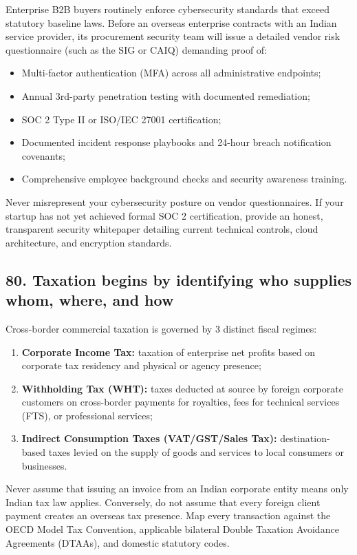Enterprise B2B buyers routinely enforce cybersecurity standards that exceed statutory baseline laws. Before an overseas enterprise contracts with an Indian service provider, its procurement security team will issue a detailed vendor risk questionnaire (such as the SIG or CAIQ) demanding proof of:
\begin{itemize}
    \item Multi-factor authentication (MFA) across all administrative endpoints;
    \item Annual 3rd-party penetration testing with documented remediation;
    \item SOC 2 Type II or ISO/IEC 27001 certification;
    \item Documented incident response playbooks and 24-hour breach notification covenants;
    \item Comprehensive employee background checks and security awareness training.
\end{itemize}
Never misrepresent your cybersecurity posture on vendor questionnaires. If your startup has not yet achieved formal SOC 2 certification, provide an honest, transparent security whitepaper detailing current technical controls, cloud architecture, and encryption standards.

\subsection{80. Taxation begins by identifying who supplies whom, where, and how}

Cross-border commercial taxation is governed by 3 distinct fiscal regimes:
\begin{enumerate}
    \item \textbf{Corporate Income Tax:} taxation of enterprise net profits based on corporate tax residency and physical or agency presence;
    \item \textbf{Withholding Tax (WHT):} taxes deducted at source by foreign corporate customers on cross-border payments for royalties, fees for technical services (FTS), or professional services;
    \item \textbf{Indirect Consumption Taxes (VAT/GST/Sales Tax):} destination-based taxes levied on the supply of goods and services to local consumers or businesses.
\end{enumerate}

Never assume that issuing an invoice from an Indian corporate entity means only Indian tax law applies. Conversely, do not assume that every foreign client payment creates an overseas tax presence. Map every transaction against the OECD Model Tax Convention, applicable bilateral Double Taxation Avoidance Agreements (DTAAs), and domestic statutory codes.

